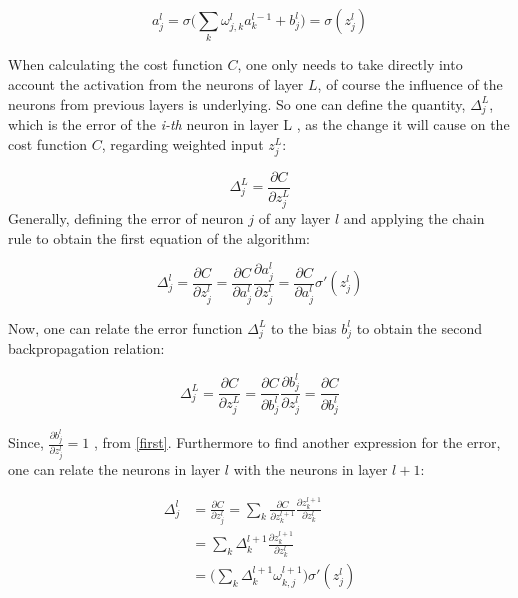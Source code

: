 \begin{equation}
a_j^l = \sigma\bigg(\sum_{k}\omega_{j,k}^l a_k^{l-1} + b_j^{l} \bigg) = \sigma(z_j^l)
\label{first}
\end{equation}

When calculating the cost function $C$, one only needs to take directly into account the activation from the neurons of layer $L$, of course the influence of the neurons from previous layers is underlying. So one can define the quantity, $ \Delta_j^L$, which is the error of the \textit{i-th} neuron in layer L , as the change it will cause on the cost function $C$, regarding weighted input $z_j^L$:

\begin{equation}
\Delta_j^L = \frac{\partial C}{\partial z_j^L}
\end{equation}
Generally, defining the error of neuron $j$ of any layer $l$ and applying the chain rule to obtain the first equation of the algorithm:

\begin{equation}
\Delta_j^l = \frac{\partial C}{\partial z_j^l} =  \frac{\partial C}{\partial a_j^l} \frac{\partial a_j^l}{\partial z_j^l} =  \frac{\partial C}{\partial a_j^l} \sigma '(z_j^l)
\label{backprop1}
\end{equation}

Now, one can relate the error function $ \Delta_j^L$ to the bias $b_j^{l}$ to obtain the second backpropagation relation:

\begin{equation}
\Delta_j^L = \frac{\partial C}{\partial z_j^L} = \frac{\partial C}{\partial b_j^l} \frac{\partial b_j^l}{\partial z_j^l} = \frac{\partial C}{\partial b_j^l}
\label{backprop2}
\end{equation}

Since, $\frac{\partial b_j^l}{\partial z_j^l} = 1$ , from \ref{first}. 
Furthermore to find another expression for the error, one can relate the neurons in layer $l$ with the neurons in layer $l+1$: 

\begin{align}
\Delta_j^l &= \frac{\partial C}{\partial z_j^l} = \sum_k \frac{\partial C}{\partial z_k^{l+1}} \frac{\partial z_k^{l+1}}{\partial z_k^{l}} \\
&= \sum_k  \Delta_k^{l+1}  \frac{\partial z_k^{l+1}}{\partial z_k^{l}} \\
&= \bigg( \sum_k  \Delta_k^{l+1} \omega_{k,j}^{l+1}\bigg) \sigma '(z_j^l)
\label{backprop3}
\end{align}

